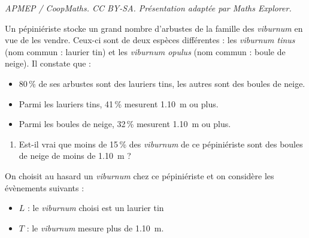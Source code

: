 \documentclass[10pt]{article}
\providecommand{\np}[2][]{{#2~#1}}
\begin{document}
\noindent\textit{APMEP / CoopMaths. CC BY-SA. Présentation adaptée par Maths Explorer.}\par\medskip
\medskip

Un pépiniériste stocke un grand nombre d'arbustes de la famille des \emph{viburnum} en vue de les
vendre. Ceux-ci sont de deux espèces différentes : les \emph{viburnum tinus} (nom commun : laurier
tin) et les \emph{viburnum opulus} (nom commun : boule de neige). Il constate que :
\begin{itemize}
\item 80\,\% de ses arbustes sont des lauriers tins, les autres sont des boules de neige.
\item Parmi les lauriers tins, 41\,\% mesurent \np[m]{1.10} ou plus.
\item Parmi les boules de neige, 32\,\% mesurent \np[m]{1.10} ou plus.
\end{itemize}

\medskip

\begin{enumerate}
	\item Est-il vrai que moins de 15\,\% des \emph{viburnum} de ce pépiniériste sont des boules de neige de moins de \np[m]{1.10} ?
\end{enumerate}

On choisit au hasard un \emph{viburnum} chez ce pépiniériste et on considère les évènements
suivants :

\begin{itemize}
\item $L$ : \og le \emph{viburnum} choisi est un laurier tin \fg
\item $T$ : \og le \emph{viburnum} mesure plus de \np[m]{1.10}\fg.
\end{itemize}
\end{document}
